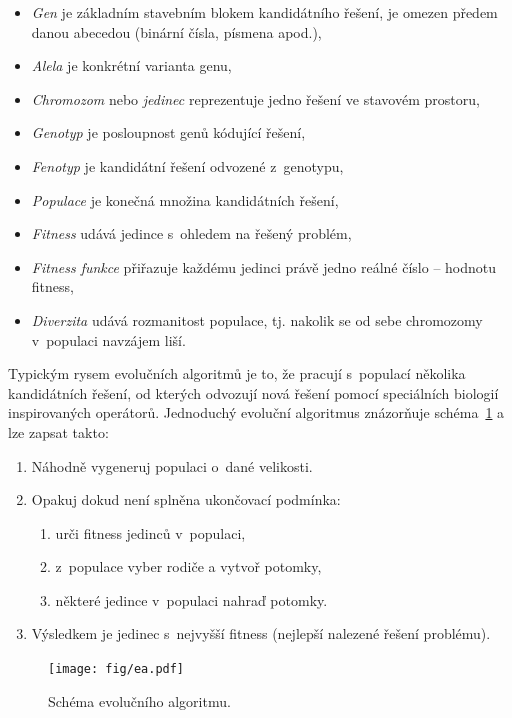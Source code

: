 \begin{itemize}
    \item\emph{Gen} je základním stavebním blokem kandidátního řešení, je omezen předem danou abecedou (binární čísla, písmena apod.),
    \item\emph{Alela} je konkrétní varianta genu,
    \item\emph{Chromozom} nebo \emph{jedinec} reprezentuje jedno řešení ve stavovém prostoru,
    \item\emph{Genotyp} je posloupnost genů kódující řešení,
    \item\emph{Fenotyp} je kandidátní řešení odvozené z~genotypu,
    \item\emph{Populace} je konečná množina kandidátních řešení,
    \item\emph{Fitness} udává  jedince s~ohledem na řešený problém,
    \item\emph{Fitness funkce} přiřazuje každému jedinci právě jedno reálné číslo -- hodnotu fitness,
    \item\emph{Diverzita} udává rozmanitost populace, tj. nakolik se od sebe chromozomy v~populaci navzájem liší.
\end{itemize}

Typickým rysem evolučních algoritmů je to, že pracují s~populací několika kandidátních řešení, od kterých odvozují nová řešení pomocí speciálních biologií inspirovaných operátorů. Jednoduchý evoluční algoritmus znázorňuje schéma~\ref{obrEA} a lze zapsat takto:

\begin{enumerate}
    \item Náhodně vygeneruj populaci o~dané velikosti.
    \item Opakuj dokud není splněna ukončovací podmínka:
    \begin{enumerate}
        \item urči fitness jedinců v~populaci,
        \item z~populace vyber rodiče a vytvoř potomky,
        \item některé jedince v~populaci nahraď potomky.
    \end{enumerate}
    \item Výsledkem je jedinec s~nejvyšší fitness (nejlepší nalezené řešení problému).
\end{enumerate}

\begin{figure}[htb]
    \centering\texttt{[image: fig/ea.pdf]}
    \caption{Schéma evolučního algoritmu.}
    \label{obrEA}
\end{figure}


